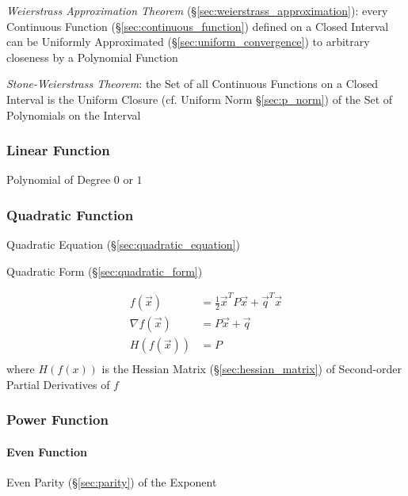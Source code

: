 \emph{Weierstrass Approximation Theorem}
(\S\ref{sec:weierstrass_approximation}): every Continuous Function
(\S\ref{sec:continuous_function}) defined on a Closed Interval can be Uniformly
Approximated (\S\ref{sec:uniform_convergence}) to arbitrary closeness by a
Polynomial Function

\emph{Stone-Weierstrass Theorem}: the Set of all Continuous Functions on a
Closed Interval is the Uniform Closure (cf. Uniform Norm \S\ref{sec:p_norm}) of
the Set of Polynomials on the Interval



\subsubsection{Linear Function}\label{sec:linear_function}

Polynomial of Degree $0$ or $1$



\subsubsection{Quadratic Function}\label{sec:quadratic_function}

\fist Quadratic Equation (\S\ref{sec:quadratic_equation})

\fist Quadratic Form (\S\ref{sec:quadratic_form})

\begin{align*}
  f(\vec{x})        & = \frac{1}{2}\vec{x}^T P \vec{x} + \vec{q}^T\vec{x} \\
  \nabla f(\vec{x}) & = P\vec{x} + \vec{q} \\
  H(f(\vec{x}))     & = P \\
\end{align*}
where $H(f(x))$ is the Hessian Matrix (\S\ref{sec:hessian_matrix}) of
Second-order Partial Derivatives of $f$



\subsubsection{Power Function}\label{sec:power_function}


\paragraph{Even Function}\label{sec:even_function}\hfill

Even Parity (\S\ref{sec:parity}) of the Exponent



